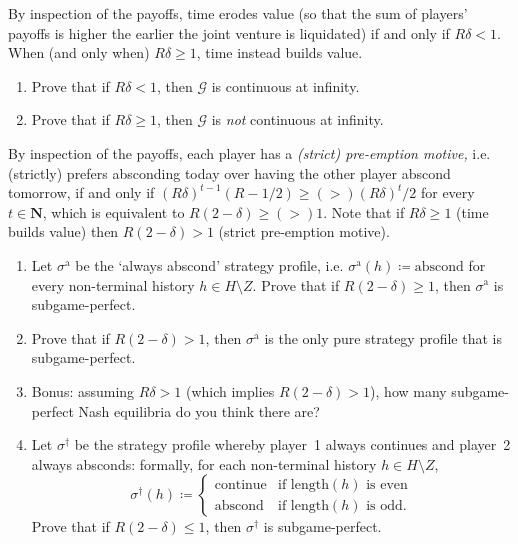 \begin{exercise}
\begin{enumerate}[label=(\alph*)]
	\end{enumerate}

	By inspection of the payoffs, time erodes value (so that the sum of players' payoffs is higher the earlier the joint venture is liquidated) if and only if $R\delta<1$. When (and only when) $R\delta \geq 1$, time instead builds value.

	\begin{enumerate}[label=(\alph*),resume]

		\item Prove that if $R\delta<1$, then $\mathcal{G}$ is continuous at infinity.

		\item Prove that if $R\delta \geq 1$, then $\mathcal{G}$ is \emph{not} continuous at infinity.

	\end{enumerate}

	By inspection of the payoffs, each player has a \emph{(strict) pre-emption motive,} i.e. (strictly) prefers absconding today over having the other player abscond tomorrow, if and only if $(R \delta)^{t-1} ( R - 1/2 ) \geq \mathrel{(>)} (R\delta)^t/2$ for every $t \in \mathbf{N}$, which is equivalent to $R(2-\delta) \geq \mathrel{(>)} 1$. Note that if $R\delta \geq 1$ (time builds value) then $R(2-\delta)>1$ (strict pre-emption motive).

	\begin{enumerate}[label=(\alph*),resume]

		\item Let $\sigma^\text{a}$ be the `always abscond' strategy profile, i.e. $\sigma^\text{a}(h) \coloneqq \text{abscond}$ for every non-terminal history $h \in H \setminus Z$. Prove that if $R(2-\delta) \geq 1$, then $\sigma^\text{a}$ is subgame-perfect.

		\item Prove that if $R(2-\delta) > 1$, then $\sigma^\text{a}$ is the only pure strategy profile that is subgame-perfect.

		\item Bonus: assuming $R\delta > 1$ (which implies $R(2-\delta) > 1$), how many subgame-perfect Nash equilibria do you think there are?

		\item Let $\sigma^\dag$ be the strategy profile whereby player~1 always continues and player~2 always absconds: formally, for each non-terminal history $h \in H \setminus Z$,
		\begin{equation*}
			\sigma^\dag(h) \coloneqq
			\begin{cases}
				\text{continue} & \text{if $\text{length}(h)$ is even} \\
				\text{abscond} & \text{if $\text{length}(h)$ is odd.} 
			\end{cases}
		\end{equation*}
		Prove that if $R(2-\delta) \leq 1$, then $\sigma^\dag$ is subgame-perfect.

	\end{enumerate}
\end{exercise}
